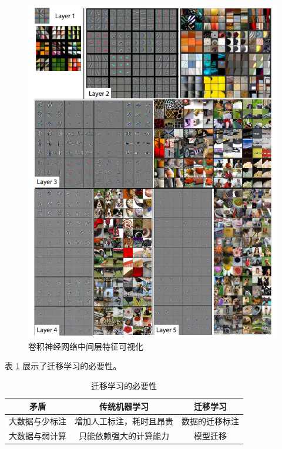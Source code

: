 \begin{figure}[htbp]
    \centering
    \includegraphics{pic/chap3/imagenet_vis.jpg}
    \caption{卷积神经网络中间层特征可视化}
    \label{fig:ImageNet:vis}
\end{figure}
 
表 \ref{table:TL:biyao} 展示了迁移学习的必要性。
{
    \begin{table}[htb] 
        \caption{迁移学习的必要性}
        \label{table:TL:biyao}
        \centering
        \begin{tabular}[t]{c|c|c}
            \hline
            矛盾 & 传统机器学习 & 迁移学习 \\
            \hline
            大数据与少标注 & 增加人工标注，耗时且昂贵 & 数据的迁移标注\\
            \hline
            大数据与弱计算 & 只能依赖强大的计算能力 & 模型迁移\\
            \hline
        \end{tabular}
    \end{table}
}


